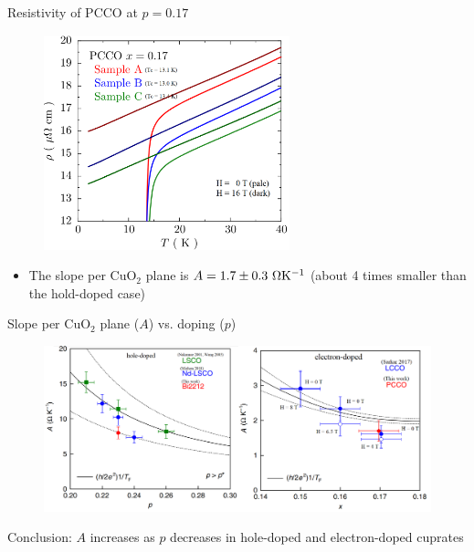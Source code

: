 \documentclass[aspectratio=169]{beamer}
\begin{document}
\begin{frame}{Resistivity of PCCO at $p = 0.17$}
\begin{figure}
\includegraphics[width=2.8in]{figs/rho_pcco_2.png}
\end{figure}
\begin{itemize}
\item The slope per CuO$_2$ plane is $A = 1.7 \pm 0.3~\rm{\Omega K^{-1}}$ (about 4 times smaller than the hold-doped case)
\end{itemize}
\end{frame}

\begin{frame}{Slope per CuO$_2$ plane ($A$) vs. doping ($p$)}
\begin{figure}
\includegraphics[width=5in]{figs/A_vs_p_both.png}
\end{figure}
Conclusion: $A$ increases as $p$ decreases in hole-doped and electron-doped cuprates
\end{frame}
\end{document}
